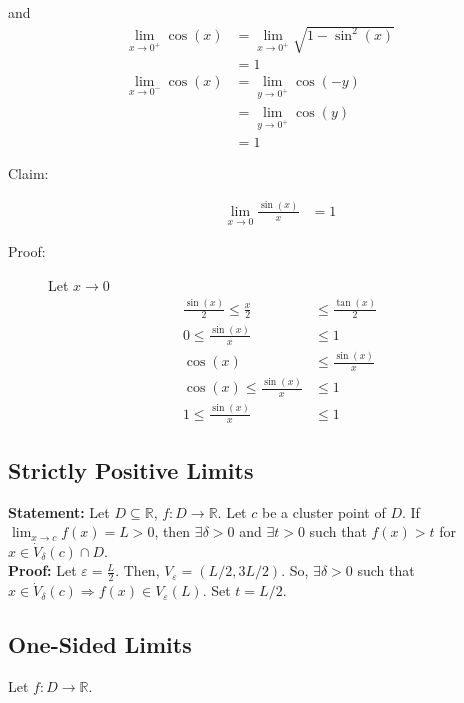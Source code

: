 \documentclass[10pt]{extarticle}
\newcommand{\R}{\mathbb{R}}
\begin{document}
    and
    \begin{align*}
      \lim_{x\rightarrow 0^+} \cos(x) &= \lim_{x\rightarrow 0^{+}} \sqrt{1-\sin^2(x)}\\
                                      &= 1\\
      \lim_{x\rightarrow 0^{-}} \cos(x) &= \lim_{y\rightarrow 0^{+}} \cos(-y)\\
                                        &= \lim_{y\rightarrow 0^{+}}\cos(y)\\
                                        &= 1
    \end{align*}
    \begin{description}
      \item[Claim:] 
        \begin{align*}
          \lim_{x\rightarrow 0}\frac{\sin(x)}{x} &= 1
        \end{align*}
      \item[Proof:] Let $x\rightarrow 0$
        \begin{align*}
          \frac{\sin(x)}{2} \leq \frac{x}{2} &\leq \frac{\tan(x)}{2}\\
          0 \leq \frac{\sin(x)}{x} &\leq 1\\
          \cos(x) &\leq \frac{\sin(x)}{x}\\
          \cos(x) \leq \frac{\sin(x)}{x} &\leq 1\\
          1 \leq \frac{\sin(x)}{x} &\leq 1
        \end{align*}
    \end{description}
  \subsection{Strictly Positive Limits}%
    \textbf{Statement:} Let $D\subseteq \R$, $f:D\rightarrow \R$. Let $c$ be a cluster point of $D$. If $\lim_{x\rightarrow c}f(x) = L > 0$, then $\exists \delta > 0$ and $\exists t > 0$ such that $f(x) > t$ for $x\in \dot{V}_{\delta}(c) \cap D$.\\

    \textbf{Proof:} Let $\varepsilon = \frac{L}{2}$. Then, $V_{\varepsilon} = (L/2,3L/2)$. So, $\exists \delta > 0$ such that $x\in \dot{V}_{\delta}(c) \Rightarrow f(x) \in V_{\varepsilon}(L)$. Set $t = L/2$.
  \subsection{One-Sided Limits}%
    Let $f: D\rightarrow \R$.\\
    
\end{document}
